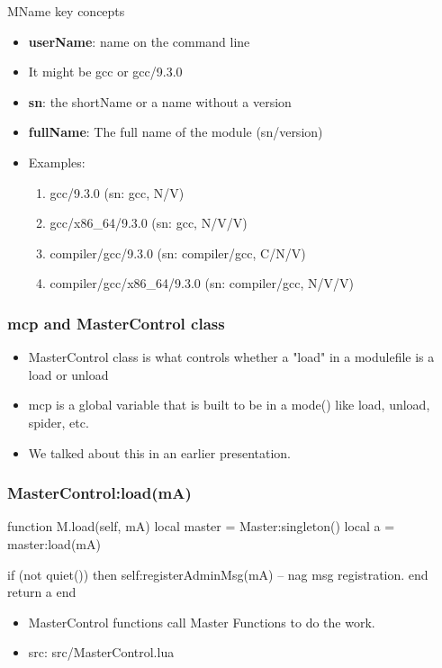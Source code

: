 \documentclass{beamer}
\begin{document}
\begin{frame}{MName key concepts}
  \begin{itemize}
    \item \textbf{userName}: name on the command line
    \item It might be gcc or gcc/9.3.0
    \item \textbf{sn}: the shortName or a name without a version
    \item \textbf{fullName}: The full name of the module (sn/version)
    \item Examples:
      \begin{enumerate}
        \item gcc/9.3.0 (sn: gcc, N/V)
        \item gcc/x86\_64/9.3.0 (sn: gcc, N/V/V)
        \item compiler/gcc/9.3.0 (sn: compiler/gcc, C/N/V)
        \item compiler/gcc/x86\_64/9.3.0 (sn: compiler/gcc, N/V/V)
      \end{enumerate}
  \end{itemize}
\end{frame}

\begin{frame}[fragile]
    \frametitle{mcp and MasterControl class}
  \begin{itemize}
    \item MasterControl class is what controls whether a "load" in a
      modulefile is a load or unload
    \item mcp is a global variable that is built to be in a mode()
      like load, unload, spider, etc.
    \item We talked about this in an earlier presentation.
  \end{itemize}
\end{frame}

\begin{frame}[fragile]
    \frametitle{MasterControl:load(mA)}
 {\tiny
    \begin{semiverbatim}
function M.load(self, mA)
   local master = Master:singleton()
   local a      = master:load(mA)

   if (not quiet()) then
      self:registerAdminMsg(mA) -- nag msg registration.
   end
   return a
end
    \end{semiverbatim}
}
  \begin{itemize}
    \item MasterControl functions call Master Functions to do the work.
    \item src: src/MasterControl.lua
  \end{itemize}
\end{frame}
\end{document}

